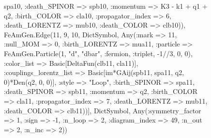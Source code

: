 \documentclass{revtex4}
\begin{document}
\begin{figure}[!htb]
\begin{center}
{spa10, :death_SPINOR => spb10, :momentum => K3 - k1 + q1 + q2, :birth_COLOR => cla10, :propagator_index => 6, :death_LORENTZ => mub10, :death_COLOR => clb10)), FeAmGen.Edge(11, 9, 10, Dict{Symbol, Any}(:mark => 11, :null_MOM => 0, :birth_LORENTZ => mua11, :particle => FeAmGen.Particle(1, "d", "dbar", :fermion, :triplet, -1//3, 0, 0), :color_list => Basic[DeltaFun(clb11, cla11)], :couplings_lorentz_list => Basic[im*GAij(spb11, spa11, q2, 0)*Den(q2, 0, 0)], :style => "Loop", :birth_SPINOR => spa11, :death_SPINOR => spb11, :momentum => q2, :birth_COLOR => cla11, :propagator_index => 7, :death_LORENTZ => mub11, :death_COLOR => clb11))], Dict{Symbol, Any}(:symmetry_factor => 1, :sign => -1, :n_loop => 2, :diagram_index => 49, :n_out => 2, :n_inc => 2)) 
}
\end{center}
\end{figure}
\end{document}
